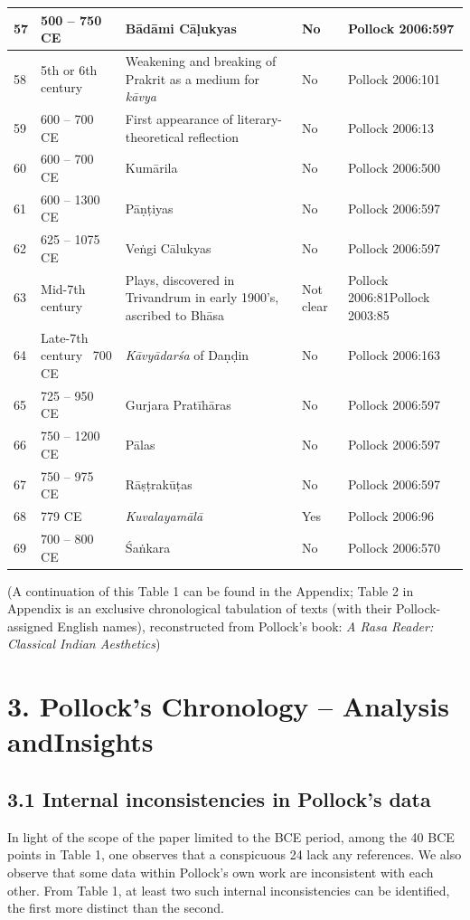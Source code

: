 \begin{longtable}{|l|p{1.9cm}|p{1.9cm}|p{1.6cm}|p{1.6cm}|}
\hline
57 & 500 – 750 CE & Bādāmi Cāḷukyas & No & Pollock 2006:597 \\
\hline
58 & 5th or 6th century & Weakening and breaking of Prakrit as a medium for \textit{kāvya} & No & Pollock 2006:101 \\
\hline
59 & 600 – 700 CE & First appearance of literary-theoretical reflection & No & Pollock 2006:13 \\
\hline
60 & 600 – 700 CE & Kumārila & No & Pollock 2006:500 \\
\hline
61 & 600 – 1300 CE & Pāṇṭiyas & No & Pollock 2006:597 \\
\hline
62 & 625 – 1075 CE & Veṅgi Cālukyas & No & Pollock 2006:597 \\
\hline
63 & Mid-7th century & Plays, discovered in Trivandrum in early 1900’s, ascribed to Bhāsa & Not clear & Pollock 2006:81\break  Pollock 2003:85 \\
\hline
64 & Late-7th century ~700 CE & \textit{Kāvyādarśa} of Daṇḍin & No & Pollock 2006:163 \\
\hline
65 & 725 – 950 CE & Gurjara Pratīhāras & No & Pollock 2006:597 \\
\hline
66 & 750 – 1200 CE & Pālas & No & Pollock 2006:597 \\
\hline
67 & 750 – 975 CE & Rāṣṭrakūṭas & No & Pollock 2006:597 \\
\hline
68 & 779 CE & \textit{Kuvalayamālā} & Yes & Pollock 2006:96 \\
\hline
69 & 700 – 800 CE & Śaṅkara & No & Pollock 2006:570 \\
\hline
\end{longtable}

(A continuation of this Table 1 can be found in the Appendix; Table 2 in Appendix is an exclusive chronological tabulation of texts (with their Pollock-assigned English names), reconstructed from Pollock’s book: \textit{A Rasa Reader: Classical Indian Aesthetics})

\newpage


\section*{3. Pollock’s Chronology – Analysis and\hfill \break Insights}

\subsection*{3.1 Internal inconsistencies in Pollock’s data}

In light of the scope of the paper limited to the BCE period, among the 40 BCE points in Table 1, one observes that a conspicuous 24 lack any references. We also observe that some data within Pollock’s own work are inconsistent with each other. From Table 1, at least two such internal inconsistencies can be identified, the first more distinct than the second.

